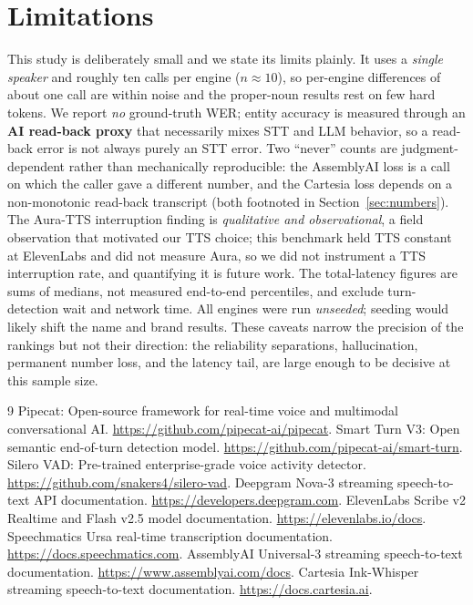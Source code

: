 \documentclass[11pt]{article}
\begin{document}
\section*{Limitations}
\label{sec:limits}
This study is deliberately small and we state its limits plainly. It uses a
\emph{single speaker} and roughly ten calls per engine ($n\approx10$), so
per-engine differences of about one call are within noise and the proper-noun
results rest on few hard tokens. We report \emph{no} ground-truth WER; entity
accuracy is measured through an \textbf{AI read-back proxy} that necessarily
mixes STT and LLM behavior, so a read-back error is not always purely an STT
error. Two ``never'' counts are judgment-dependent rather than mechanically
reproducible: the AssemblyAI loss is a call on which the caller gave a different
number, and the Cartesia loss depends on a non-monotonic read-back transcript
(both footnoted in Section~\ref{sec:numbers}). The Aura-TTS interruption finding
is \emph{qualitative and observational}, a field observation that motivated our
TTS choice; this benchmark held TTS constant at ElevenLabs and did not measure
Aura, so we did not instrument a TTS interruption rate, and quantifying it is
future work. The total-latency figures are sums of medians, not measured
end-to-end percentiles, and exclude turn-detection wait and network time. All engines were run \emph{unseeded};
seeding would likely shift the name and brand results. These caveats narrow the
precision of the rankings but not their direction: the reliability
separations, hallucination, permanent number loss, and the latency tail, are
large enough to be decisive at this sample size.

\begin{thebibliography}{9}
\small
{} Pipecat: Open-source framework for real-time voice and
multimodal conversational AI. \url{https://github.com/pipecat-ai/pipecat}.
 Smart Turn V3: Open semantic end-of-turn detection model.
\url{https://github.com/pipecat-ai/smart-turn}.
 Silero VAD: Pre-trained enterprise-grade voice activity
detector. \url{https://github.com/snakers4/silero-vad}.
 Deepgram Nova-3 streaming speech-to-text API documentation.
\url{https://developers.deepgram.com}.
 ElevenLabs Scribe v2 Realtime and Flash v2.5 model
documentation. \url{https://elevenlabs.io/docs}.
 Speechmatics Ursa real-time transcription documentation.
\url{https://docs.speechmatics.com}.
 AssemblyAI Universal-3 streaming speech-to-text
documentation. \url{https://www.assemblyai.com/docs}.
 Cartesia Ink-Whisper streaming speech-to-text documentation.
\url{https://docs.cartesia.ai}.
\end{thebibliography}
\end{document}
